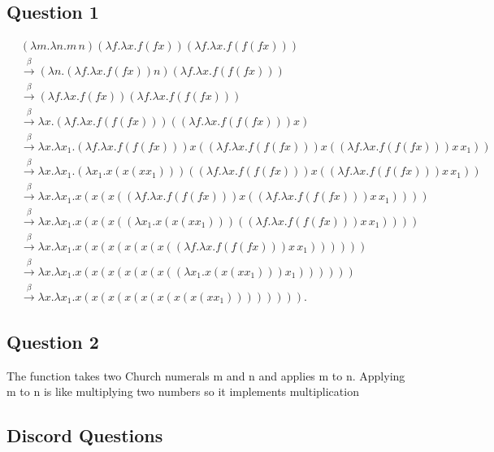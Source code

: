 \documentclass{article}
\theoremstyle{plain}
\theoremstyle{definition}
\theoremstyle{remark}
\begin{document}
\subsection{Question 1}

\begin{align*}
  & (\lambda m.\lambda n.m \, n)(\lambda f.\lambda x.f(fx))(\lambda f.\lambda x.f(f(fx))) \\
  & \overset{\beta}{\to} (\lambda n.(\lambda f.\lambda x.f(fx))n)(\lambda f.\lambda x.f(f(fx))) \\
  & \overset{\beta}{\to} (\lambda f.\lambda x.f(fx))(\lambda f.\lambda x.f(f(fx))) \\
  & \overset{\beta}{\to} \lambda x.(\lambda f.\lambda x.f(f(fx)))((\lambda f.\lambda x.f(f(fx)))x) \\
  & \overset{\beta}{\to} \lambda x.\lambda x_1.(\lambda f.\lambda x.f(f(fx)))x((\lambda f.\lambda x.f(f(fx)))x((\lambda f.\lambda x.f(f(fx)))x \, x_1)) \\
  & \overset{\beta}{\to} \lambda x.\lambda x_1.(\lambda x_1.x(x(xx_1)))((\lambda f.\lambda x.f(f(fx)))x((\lambda f.\lambda x.f(f(fx)))x \, x_1)) \\
  & \overset{\beta}{\to} \lambda x.\lambda x_1.x(x(x((\lambda f.\lambda x.f(f(fx)))x((\lambda f.\lambda x.f(f(fx)))x \, x_1)))) \\
  & \overset{\beta}{\to} \lambda x.\lambda x_1.x(x(x((\lambda x_1.x(x(xx_1)))((\lambda f.\lambda x.f(f(fx)))x \, x_1)))) \\
  & \overset{\beta}{\to} \lambda x.\lambda x_1.x(x(x(x(x(x((\lambda f.\lambda x.f(f(fx)))x \, x_1)))))) \\
  & \overset{\beta}{\to} \lambda x.\lambda x_1.x(x(x(x(x(x((\lambda x_1.x(x(xx_1)))x_1)))))) \\
  & \overset{\beta}{\to} \lambda x.\lambda x_1.x(x(x(x(x(x(x(x(xx_1)))))))).
\end{align*}


\subsection{Question 2}

The function takes two Church numerals m and n and applies m to n. Applying m to n is like multiplying two numbers so it implements multiplication

\subsection{Discord Questions}
\end{document}
